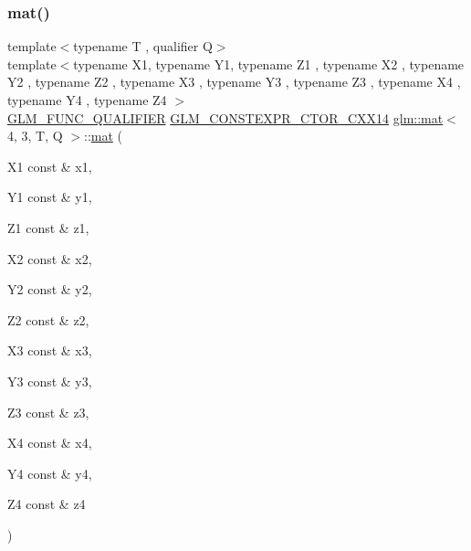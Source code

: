 \subsubsection{\texorpdfstring{mat()}{mat()}\hspace{0.1cm}{\footnotesize\ttfamily [19/21]}}
{\footnotesize\ttfamily template$<$typename T , qualifier Q$>$ \\
template$<$typename X1, typename Y1, typename Z1 , typename X2 , typename Y2 , typename Z2 , typename X3 , typename Y3 , typename Z3 , typename X4 , typename Y4 , typename Z4 $>$ \\
\hyperlink{setup_8hpp_a33fdea6f91c5f834105f7415e2a64407}{G\+L\+M\+\_\+\+F\+U\+N\+C\+\_\+\+Q\+U\+A\+L\+I\+F\+I\+ER} \hyperlink{setup_8hpp_a0900f9145e68bf6061b6f5e7be3fa751}{G\+L\+M\+\_\+\+C\+O\+N\+S\+T\+E\+X\+P\+R\+\_\+\+C\+T\+O\+R\+\_\+\+C\+X\+X14} \hyperlink{structglm_1_1mat}{glm\+::mat}$<$ 4, 3, T, Q $>$\+::\hyperlink{structglm_1_1mat}{mat} (\begin{DoxyParamCaption}\item[{X1 const \&}]{x1,  }\item[{Y1 const \&}]{y1,  }\item[{Z1 const \&}]{z1,  }\item[{X2 const \&}]{x2,  }\item[{Y2 const \&}]{y2,  }\item[{Z2 const \&}]{z2,  }\item[{X3 const \&}]{x3,  }\item[{Y3 const \&}]{y3,  }\item[{Z3 const \&}]{z3,  }\item[{X4 const \&}]{x4,  }\item[{Y4 const \&}]{y4,  }\item[{Z4 const \&}]{z4 }\end{DoxyParamCaption})}

\mbox{\label{structglm_1_1mat_3_014_00_013_00_01_t_00_01_q_01_4_a51464174c591e7c9c6feea63148a686c}} 

